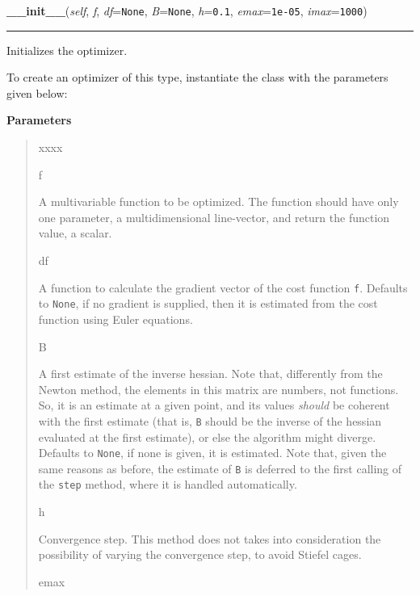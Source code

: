    \begin{boxedminipage}{\textwidth}

    \raggedright \textbf{\_\_init\_\_}(\textit{self}, \textit{f}, \textit{df}=\texttt{None}, \textit{B}=\texttt{None}, \textit{h}=\texttt{0.1}, \textit{emax}=\texttt{1e-05}, \textit{imax}=\texttt{1000})

    \vspace{-1.5ex}

    \rule{\textwidth}{0.5\fboxrule}

Initializes the optimizer.

To create an optimizer of this type, instantiate the class with the
parameters given below:
    \vspace{1ex}

      \textbf{Parameters}
      \begin{quote}
        \begin{Ventry}{xxxx}

          \item[f]


A multivariable function to be optimized. The function should have
only one parameter, a multidimensional line-vector, and return the
function value, a scalar.
          \item[df]


A function to calculate the gradient vector of the cost function
\texttt{f}. Defaults to \texttt{None}, if no gradient is supplied, then it is
estimated from the cost function using Euler equations.
          \item[B]


A first estimate of the inverse hessian. Note that, differently from
the Newton method, the elements in this matrix are numbers, not
functions. So, it is an estimate at a given point, and its values
\emph{should} be coherent with the first estimate (that is, \texttt{B} should
be the inverse of the hessian evaluated at the first estimate), or
else the algorithm might diverge. Defaults to \texttt{None}, if none is
given, it is estimated. Note that, given the same reasons as before,
the estimate of \texttt{B} is deferred to the first calling of the
\texttt{step} method, where it is handled automatically.
          \item[h]


Convergence step. This method does not takes into consideration the
possibility of varying the convergence step, to avoid Stiefel cages.
          \item[emax]



\end{Ventry}
\end{quote}
\end{boxedminipage}
